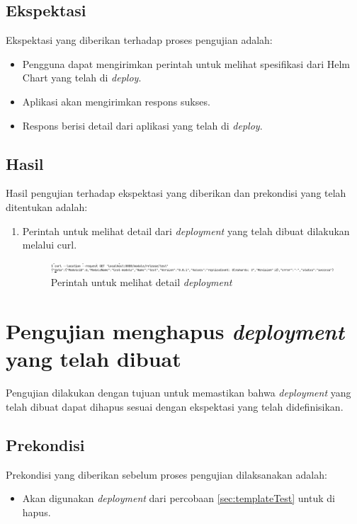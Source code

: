 \subsection{Ekspektasi}
Ekspektasi yang diberikan terhadap proses pengujian adalah:
\begin{itemize}
    \item Pengguna dapat mengirimkan perintah untuk melihat spesifikasi dari Helm Chart yang telah di \textit{deploy}.
    \item Aplikasi akan mengirimkan respons sukses.
    \item Respons berisi detail dari aplikasi yang telah di \textit{deploy}.
\end{itemize}
\subsection{Hasil}
Hasil pengujian terhadap ekspektasi yang diberikan dan prekondisi yang telah ditentukan adalah:
\begin{enumerate}
    \item Perintah untuk melihat detail dari \textit{deployment} yang telah dibuat dilakukan melalui curl.
    \begin{figure}
    	\centering
    	\includegraphics[width=1\textwidth]{pics/5.7.getDeployment.png}
    	\caption{Perintah untuk melihat detail \textit{deployment}}
    	\label{fig:getDeployment}
    \end{figure}
\end{enumerate}


\section{Pengujian menghapus \textit{deployment} yang telah dibuat}
Pengujian dilakukan dengan tujuan untuk memastikan bahwa \textit{deployment} yang telah dibuat dapat dihapus sesuai dengan ekspektasi yang telah didefinisikan.
\subsection{Prekondisi}
Prekondisi yang diberikan sebelum proses pengujian dilaksanakan adalah:
\begin{itemize}
    \item Akan digunakan \textit{deployment} dari percobaan \ref{sec:templateTest} untuk di hapus.
\end{itemize}
